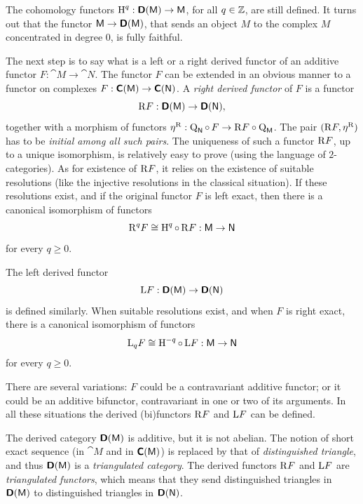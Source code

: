 The cohomology functors 
$\operatorname{H}^q : \boldsymbol{\mathsf{D}}(\operatorname{\mathsf{M}}) \to \operatorname{\mathsf{M}}$,
for all $q \in \mathbb{Z}$, are still defined. 
It turns out that the functor $\operatorname{\mathsf{M}} \to \boldsymbol{\mathsf{D}}(\operatorname{\mathsf{M}})$,
that sends an object $M$ to the complex $M$ concentrated in degree $0$, is 
fully faithful. 

The next step is to say what is a left or a right derived functor of an 
additive functor $F : \cat{M} \to \cat{N}$. The functor $F$ can be extended 
in an obvious manner to a functor on complexes
$F : \boldsymbol{\mathsf{C}}(\operatorname{\mathsf{M}}) \to \boldsymbol{\mathsf{C}}(\operatorname{\mathsf{N}})$.
A {\em right derived functor} of $F$ is a functor 
\begin{equation} \label{eqn:4990}
\mathrm{R} F : \boldsymbol{\mathsf{D}}(\operatorname{\mathsf{M}}) \to \boldsymbol{\mathsf{D}}(\operatorname{\mathsf{N}}) ,
\end{equation}
together with a morphism of functors 
$\eta^{\mathrm{R}} : \operatorname{Q}_{\operatorname{\mathsf{N}}} \circ \, F \to \mathrm{R} F \circ 
\operatorname{Q}_{\operatorname{\mathsf{M}}}$.
The pair $(\mathrm{R} F, \eta^{\mathrm{R}})$ has to be {\em initial among all such 
pairs}. The uniqueness of such a functor $\mathrm{R} F$, up to a unique 
isomorphism, is relatively easy to prove (using the language of 
$2$-categories). As for existence of $\mathrm{R} F$, it relies on the 
existence of suitable resolutions (like the injective resolutions in the 
classical situation). If these resolutions exist, 
and if the original functor $F$ is left exact,
then there is a canonical isomorphism of functors 
\begin{equation} \label{eqn:4991}
\mathrm{R}^q F \cong \operatorname{H}^q \circ \, \mathrm{R} F : \operatorname{\mathsf{M}} \to \operatorname{\mathsf{N}} 
\end{equation}
for every $q \geq 0$. 

The left derived functor 
\begin{equation} \label{eqn:4992}
\mathrm{L} F : \boldsymbol{\mathsf{D}}(\operatorname{\mathsf{M}}) \to \boldsymbol{\mathsf{D}}(\operatorname{\mathsf{N}}) 
\end{equation}
is defined similarly. When suitable resolutions exist, and when 
$F$ is right exact, there is a canonical isomorphism of functors
\begin{equation} \label{eqn:4993}
\mathrm{L}_q F \cong \operatorname{H}^{-q} \circ \, \mathrm{L} F : \operatorname{\mathsf{M}} \to \operatorname{\mathsf{N}} 
\end{equation}
for every $q \geq 0$. 

There are several variations: $F$ could be a contravariant additive 
functor; or it could be an additive bifunctor, contravariant in one or two of 
its arguments. In all these situations the derived (bi)functors 
$\mathrm{R} F$ and $\mathrm{L} F$ can be defined. 

The derived category $\boldsymbol{\mathsf{D}}(\operatorname{\mathsf{M}})$ is additive, but it is not abelian. 
The notion of short exact sequence (in $\cat{M}$ and in $\boldsymbol{\mathsf{C}}(\operatorname{\mathsf{M}})$) is 
replaced by that of {\em distinguished 
triangle}, and thus $\boldsymbol{\mathsf{D}}(\operatorname{\mathsf{M}})$ is a {\em triangulated category}. 
The derived functors $\mathrm{R} F$ and $\mathrm{L} F$ are {\em triangulated 
functors}, which means that they send distinguished triangles in 
$\boldsymbol{\mathsf{D}}(\operatorname{\mathsf{M}})$ to distinguished triangles in $\boldsymbol{\mathsf{D}}(\operatorname{\mathsf{N}})$. 

